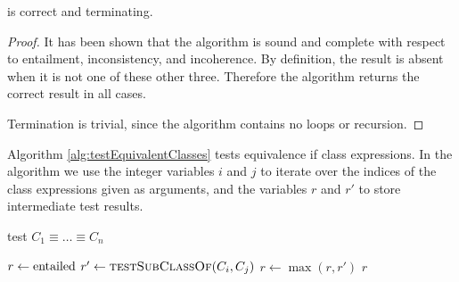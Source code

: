 \documentclass[paper.tex]{subfiles}
\begin{document}
\begin{theorem}
  \label{thm:testSubClassOf}
   is correct and terminating.
\end{theorem}
\begin{proof}
  It has been shown that the algorithm is sound and complete with respect to entailment, inconsistency, and incoherence.  By definition, the result is absent when it is not one of these other three.  Therefore the algorithm returns the correct result in all cases.

  Termination is trivial, since the algorithm contains no loops or recursion.
\end{proof}

Algorithm \ref{alg:testEquivalentClasses} tests equivalence if class expressions.
In the algorithm we use the integer variables $i$ and $j$ to iterate over the indices of the class expressions given as arguments, and the variables $r$ and $r'$ to store intermediate test results.

\begin{algorithm}[H]
  \caption{test $C_1 \equiv \ldots \equiv C_n$}
  \label{alg:testEquivalentClasses}
  \begin{algorithmic}[1]
    \raggedright
      \State $r \gets \mathrm{entailed}$
          \State $r' \gets \Call{testSubClassOf}{C_i, C_j}$
          \label{alg:testEquivalentClasses:inner}
          \State $r \gets \max(r, r')$
        \EndFor
      \EndFor
      \State \Return $r$
    \EndFunction
  \end{algorithmic}
\end{algorithm}
\end{document}
